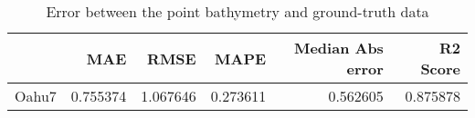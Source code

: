 \begin{table}[h!]
\caption{Error between the point bathymetry and ground-truth data}
\label{tab:Oahu7_lidar_error}
\begin{tabular}{lrrrrr}
\toprule
 & MAE & RMSE & MAPE & Median Abs error & R2 Score \\
\midrule
Oahu7 & 0.755374 & 1.067646 & 0.273611 & 0.562605 & 0.875878 \\
\bottomrule
\end{tabular}
\end{table}
